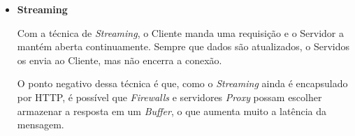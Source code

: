 \documentclass[a4paper,12pt]{article}
\begin{document}
\begin{itemize}








    \item \textbf{Streaming}

    Com a técnica de \emph{Streaming}, o Cliente manda uma requisição e o Servidor a mantém aberta continuamente. Sempre que dados são atualizados, o Servidos os envia ao Cliente, mas não encerra a conexão.

    O ponto negativo dessa técnica é que, como o \emph{Streaming} ainda é encapsulado por HTTP, é possível que \emph{Firewalls} e servidores \emph{Proxy} possam escolher armazenar a resposta em um \emph{Buffer}, o que aumenta muito a latência da mensagem.

\end{itemize}
\end{document}
